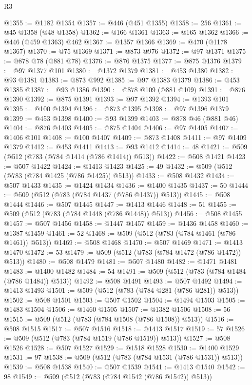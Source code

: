 \begin{lexlean}{R3}
\begin{coremodule}
@1355 := @1182 @1354
@1357 := @446 (@451 @1355)
@1358 := 256
@1361 := @45 @1358 (@48 @1358)
@1362 := @166 @1361
@1363 := @165 @1362
@1366 := @446 (@459 @1363) @462
@1367 := @1357 @1366
@1369 := @470 (@1178 @1367)
@1370 := @75 @1369
@1371 := @873 @976
@1372 := @97 @1371
@1375 := @878 @78 (@881 @78)
@1376 := @876 @1375
@1377 := @875 @1376
@1379 := @97 @1377 @101
@1380 := @1372 @1379
@1381 := @453 @1380
@1382 := @93 @1381
@1383 := @873 @992
@1385 := @97 @1383 @1379
@1386 := @453 @1385
@1387 := @93 @1386
@1390 := @878 @109 (@881 @109)
@1391 := @876 @1390
@1392 := @875 @1391
@1393 := @97 @1392
@1394 := @1393 @101
@1395 := @100 @1394
@1396 := @873 @1395
@1398 := @97 @1396 @1379
@1399 := @453 @1398
@1400 := @93 @1399
@1403 := @878 @46 (@881 @46)
@1404 := @876 @1403
@1405 := @875 @1404
@1406 := @97 @1405
@1407 := @1406 @101
@1408 := @100 @1407
@1409 := @873 @1408
@1411 := @97 @1409 @1379
@1412 := @453 @1411
@1413 := @93 @1412
@1414 := 48
@1421 := @509 (@512 (@783 (@784 @1414 (@786 @1414)) @513))
@1422 := @508 @1421
@1423 := @507 @1422
@1424 := @1413 @1423
@1425 := 49
@1432 := @509 (@512 (@783 (@784 @1425 (@786 @1425)) @513))
@1433 := @508 @1432
@1434 := @507 @1433
@1435 := @1424 @1434
@1436 := @1400 @1435
@1437 := 50
@1444 := @509 (@512 (@783 (@784 @1437 (@786 @1437)) @513))
@1445 := @508 @1444
@1446 := @507 @1445
@1447 := @1413 @1446
@1448 := 51
@1455 := @509 (@512 (@783 (@784 @1448 (@786 @1448)) @513))
@1456 := @508 @1455
@1457 := @507 @1456
@1458 := @1447 @1457
@1459 := @1436 @1458
@1460 := @1387 @1459
@1461 := 52
@1468 := @509 (@512 (@783 (@784 @1461 (@786 @1461)) @513))
@1469 := @508 @1468
@1470 := @507 @1469
@1471 := @1413 @1470
@1472 := 53
@1479 := @509 (@512 (@783 (@784 @1472 (@786 @1472)) @513))
@1480 := @508 @1479
@1481 := @507 @1480
@1482 := @1471 @1481
@1483 := @1400 @1482
@1484 := 54
@1491 := @509 (@512 (@783 (@784 @1484 (@786 @1484)) @513))
@1492 := @508 @1491
@1493 := @507 @1492
@1494 := @1413 @1493
@1501 := @509 (@512 (@783 (@784 @281 (@786 @281)) @513))
@1502 := @508 @1501
@1503 := @507 @1502
@1504 := @1494 @1503
@1505 := @1483 @1504
@1506 := @1460 @1505
@1507 := @1382 @1506
@1508 := 56
@1515 := @509 (@512 (@783 (@784 @1508 (@786 @1508)) @513))
@1516 := @508 @1515
@1517 := @507 @1516
@1518 := @1413 @1517
@1519 := 57
@1526 := @509 (@512 (@783 (@784 @1519 (@786 @1519)) @513))
@1527 := @508 @1526
@1528 := @507 @1527
@1529 := @1518 @1528
@1530 := @1400 @1529
@1531 := 97
@1538 := @509 (@512 (@783 (@784 @1531 (@786 @1531)) @513))
@1539 := @508 @1538
@1540 := @507 @1539
@1541 := @1413 @1540
@1542 := 98
@1549 := @509 (@512 (@783 (@784 @1542 (@786 @1542)) @513))

\end{coremodule}
\end{lexlean}
